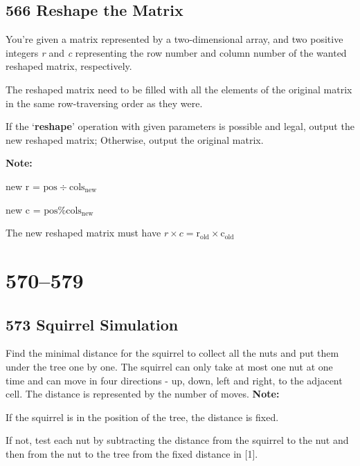 \documentclass[a4paper,12pt]{article}
\begin{document}
	\subsection{566 Reshape the Matrix}
	You're given a matrix represented by a two-dimensional array, and two positive integers \textit{r} and \textit{c} representing the row number and column number of the wanted reshaped matrix, respectively.
	\par
	The reshaped matrix need to be filled with all the elements of the original matrix in the same row-traversing order as they were.
	\par
	If the `\textbf{reshape}' operation with given parameters is possible and legal, output the new reshaped matrix; Otherwise, output the original matrix.
	\par
	\noindent
	\textbf{Note:}
	\begin{enumerate}[label={[\arabic*]}]
		\item new r = $\text{pos} \div \text{cols}_{\text{new}}$
		\item new c = $\text{pos} \% \text{cols}_{\text{new}}$
		\item The new reshaped matrix must have $r \times c = \text{r}_{\text{old}} \times \text{c}_{\text{old}}$ 
	\end{enumerate}
	
	
	
	
	\section{570--579}
	\subsection{573 Squirrel Simulation}
	Find the minimal distance for the squirrel to collect all the nuts and put them under the tree one by one. The squirrel can only take at most one nut at one time and can move in four directions - up, down, left and right, to the adjacent cell. The distance is represented by the number of moves.
	\vspace{0.5em}
	\noindent
	\textbf{\large{Note:}}
	\begin{enumerate}[label={[\arabic*]}]
		\item If the squirrel is in the position of the tree, the distance is fixed.
		\item If not, test each nut by subtracting the distance from the squirrel to the nut and then from the nut to the tree from the fixed distance in [1].
	\end{enumerate}
	
\end{document}
